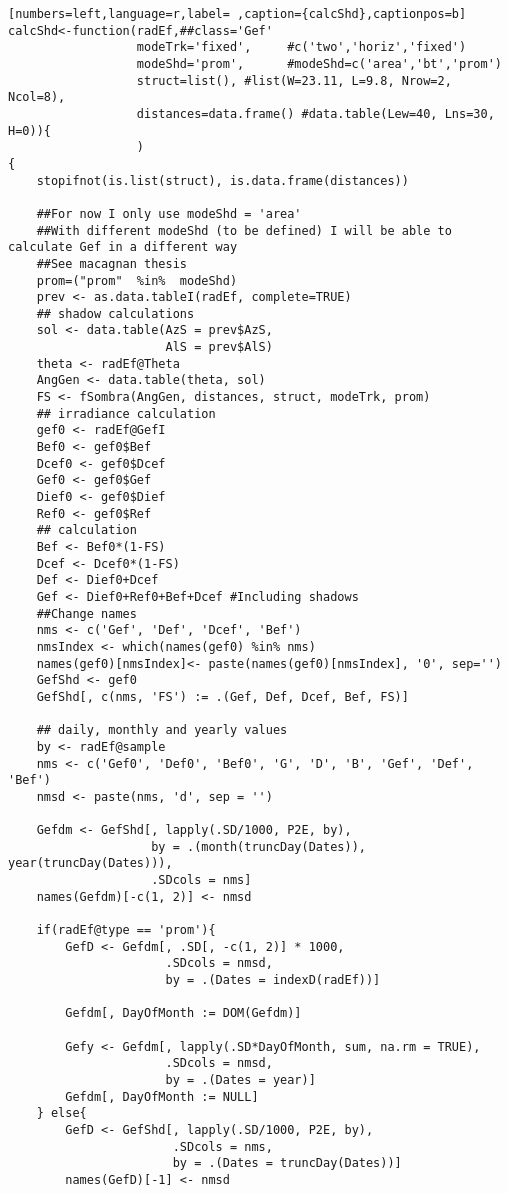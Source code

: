 \begin{lstlisting}[numbers=left,language=r,label= ,caption={calcShd},captionpos=b]
calcShd<-function(radEf,##class='Gef'
                  modeTrk='fixed',     #c('two','horiz','fixed')
                  modeShd='prom',      #modeShd=c('area','bt','prom')
                  struct=list(), #list(W=23.11, L=9.8, Nrow=2, Ncol=8), 
                  distances=data.frame() #data.table(Lew=40, Lns=30, H=0)){
                  )
{
    stopifnot(is.list(struct), is.data.frame(distances))

    ##For now I only use modeShd = 'area'
    ##With different modeShd (to be defined) I will be able to calculate Gef in a different way
    ##See macagnan thesis
    prom=("prom"  %in%  modeShd)
    prev <- as.data.tableI(radEf, complete=TRUE)
    ## shadow calculations
    sol <- data.table(AzS = prev$AzS,
                      AlS = prev$AlS)
    theta <- radEf@Theta
    AngGen <- data.table(theta, sol)
    FS <- fSombra(AngGen, distances, struct, modeTrk, prom)
    ## irradiance calculation
    gef0 <- radEf@GefI
    Bef0 <- gef0$Bef
    Dcef0 <- gef0$Dcef
    Gef0 <- gef0$Gef
    Dief0 <- gef0$Dief
    Ref0 <- gef0$Ref
    ## calculation
    Bef <- Bef0*(1-FS)
    Dcef <- Dcef0*(1-FS)
    Def <- Dief0+Dcef
    Gef <- Dief0+Ref0+Bef+Dcef #Including shadows
    ##Change names
    nms <- c('Gef', 'Def', 'Dcef', 'Bef')
    nmsIndex <- which(names(gef0) %in% nms)
    names(gef0)[nmsIndex]<- paste(names(gef0)[nmsIndex], '0', sep='')
    GefShd <- gef0
    GefShd[, c(nms, 'FS') := .(Gef, Def, Dcef, Bef, FS)]

    ## daily, monthly and yearly values
    by <- radEf@sample
    nms <- c('Gef0', 'Def0', 'Bef0', 'G', 'D', 'B', 'Gef', 'Def', 'Bef')
    nmsd <- paste(nms, 'd', sep = '')

    Gefdm <- GefShd[, lapply(.SD/1000, P2E, by),
                    by = .(month(truncDay(Dates)), year(truncDay(Dates))),
                    .SDcols = nms]
    names(Gefdm)[-c(1, 2)] <- nmsd

    if(radEf@type == 'prom'){
        GefD <- Gefdm[, .SD[, -c(1, 2)] * 1000,
                      .SDcols = nmsd,
                      by = .(Dates = indexD(radEf))] 

        Gefdm[, DayOfMonth := DOM(Gefdm)]

        Gefy <- Gefdm[, lapply(.SD*DayOfMonth, sum, na.rm = TRUE),
                      .SDcols = nmsd,
                      by = .(Dates = year)]
        Gefdm[, DayOfMonth := NULL]
    } else{    
        GefD <- GefShd[, lapply(.SD/1000, P2E, by),
                       .SDcols = nms,
                       by = .(Dates = truncDay(Dates))]
        names(GefD)[-1] <- nmsd


\end{lstlisting}
